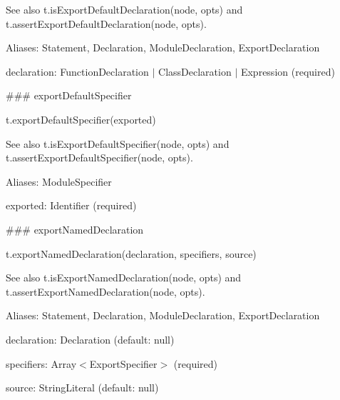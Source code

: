 See also {\ttfamily t.\+is\+Export\+Default\+Declaration(node, opts)} and {\ttfamily t.\+assert\+Export\+Default\+Declaration(node, opts)}.

Aliases\+: {\ttfamily Statement}, {\ttfamily Declaration}, {\ttfamily Module\+Declaration}, {\ttfamily Export\+Declaration}


\begin{DoxyItemize}
\item {\ttfamily declaration}\+: {\ttfamily Function\+Declaration $\vert$ Class\+Declaration $\vert$ Expression} (required) 


\end{DoxyItemize}

\#\#\# export\+Default\+Specifier 
\begin{DoxyCode}
t.exportDefaultSpecifier(exported)
\end{DoxyCode}


See also {\ttfamily t.\+is\+Export\+Default\+Specifier(node, opts)} and {\ttfamily t.\+assert\+Export\+Default\+Specifier(node, opts)}.

Aliases\+: {\ttfamily Module\+Specifier}


\begin{DoxyItemize}
\item {\ttfamily exported}\+: {\ttfamily Identifier} (required) 


\end{DoxyItemize}

\#\#\# export\+Named\+Declaration 
\begin{DoxyCode}
t.exportNamedDeclaration(declaration, specifiers, source)
\end{DoxyCode}


See also {\ttfamily t.\+is\+Export\+Named\+Declaration(node, opts)} and {\ttfamily t.\+assert\+Export\+Named\+Declaration(node, opts)}.

Aliases\+: {\ttfamily Statement}, {\ttfamily Declaration}, {\ttfamily Module\+Declaration}, {\ttfamily Export\+Declaration}


\begin{DoxyItemize}
\item {\ttfamily declaration}\+: {\ttfamily Declaration} (default\+: {\ttfamily null})
\item {\ttfamily specifiers}\+: {\ttfamily Array$<$Export\+Specifier$>$} (required)
\item {\ttfamily source}\+: {\ttfamily String\+Literal} (default\+: {\ttfamily null}) 


\end{DoxyItemize}

